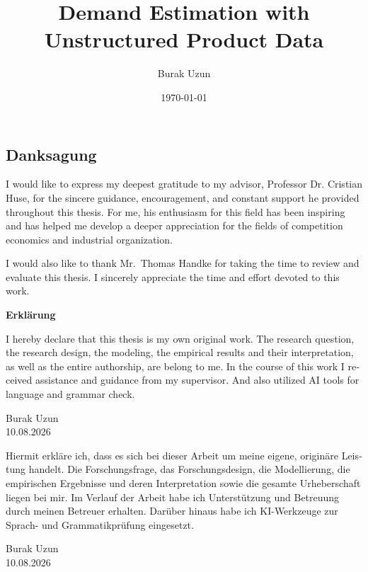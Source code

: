 \documentclass[a4paper,titlepage,liststotoc,final,oneside,openany,BCOR12mm,fontsize=12pt]{scrreprt}
\title{Demand Estimation with Unstructured Product Data}
\author{Burak Uzun}
\date{\today}
\begin{document}

\begin{titlepage}
 
\end{titlepage}

\newpage
\thispagestyle{empty}
\quad
\begin{otherlanguage}{ngerman}
\section*{Danksagung}
I would like to express my deepest gratitude to my advisor, Professor Dr.
Cristian Huse, for the sincere guidance, encouragement, and constant support he
provided throughout this thesis. For me, his enthusiasm for this field has been
inspiring and has helped me develop a deeper appreciation for the fields of
competition economics and industrial organization.

I would also like to thank Mr.\ Thomas Handke for taking the time to review and
evaluate this thesis. I sincerely appreciate the time and effort devoted to this
work.

\newpage
\thispagestyle{empty}
\vspace{1.0cm}
\begin{center}
\begin{Large}
\textbf{Erkl\"arung}
\end{Large}
\end{center}

\begin{otherlanguage}{english}
\noindent
I hereby declare that this thesis is my own original work. The research question,
the research design, the modeling, the empirical results and their
interpretation, as well as the entire authorship, are belong to me. In the course
of this work I received assistance and guidance from my supervisor. And also
utilized AI tools for language and grammar check.

\medskip
\noindent
Burak Uzun\\
10.08.2026
\end{otherlanguage}

\bigskip
\noindent
Hiermit erkl\"are ich, dass es sich bei dieser Arbeit um meine eigene,
origin\"are Leistung handelt. Die Forschungsfrage, das Forschungsdesign, die
Modellierung, die empirischen Ergebnisse und deren Interpretation sowie die
gesamte Urheberschaft liegen bei mir. Im Verlauf der Arbeit habe ich
Unterst\"utzung und Betreuung durch meinen Betreuer erhalten. Dar\"uber hinaus
habe ich KI-Werkzeuge zur Sprach- und Grammatikpr\"ufung eingesetzt.

\medskip
\noindent
Burak Uzun\\
10.08.2026
\end{otherlanguage}
\end{document}
